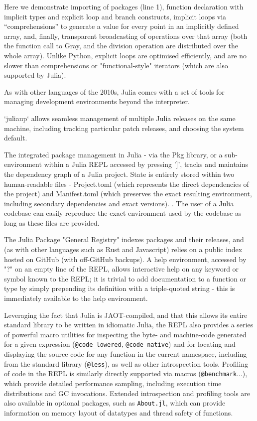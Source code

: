 \documentclass{webofc}
\begin{document}
Here we demonstrate importing of packages (line 1), function declaration with implicit types and explicit loop and branch constructs, implicit loops via ``comprehensions'' to generate a  value for every point in an implicitly defined array, and, finally, transparent broadcasting of operations over that array (both the function call to Gray, and the division operation are distributed over the whole array). 
Unlike Python, explicit loops are optimised efficiently, and are no slower than comprehensions or "functional-style" iterators (which are also supported by Julia).



As with other languages of the 2010s, Julia comes with a set of tools for managing development environments beyond the interpreter.

`juliaup` allows seamless management of multiple Julia releases on the same machine, including tracking particular patch releases, and 
choosing the system default.

The integrated package management in Julia - via the Pkg library, or a sub-environment within a Julia REPL accessed by pressing '$]$', 
tracks and maintains the dependency graph of a Julia project. State is entirely stored within two human-readable files - Project.toml (which represents the 
direct dependencies of the project) and Manifest.toml (which preserves the exact resulting environment, including secondary dependencies and exact versions).
. The user of a Julia codebase can easily reproduce the exact environment used by the codebase as long as these files are provided.

The Julia Package "General Registry" indexes packages and their releases, and (as with other languages such as Rust and Javascript) relies on a public
index hosted on GitHub (with off-GitHub backups).
A help environment, accessed by "?" on an empty line of the REPL, allows interactive help on any keyword or symbol known to the REPL; it is trivial to add documentation to a function or type 
by simply prepending its definition with a triple-quoted string - this is immediately available to the help environment.

Leveraging the fact that Julia is JAOT-compiled, and that this allows its entire standard library to be written in idiomatic Julia, the REPL also provides
a series of powerful macro utilities for inspecting the byte- and machine-code generated for a given expression (\verb$@code_lowered$, \verb$@code_native$) and
for locating and displaying the source code for any function in the current namespace, including from the standard library (\verb$@less$), as well as other introspection
tools. Profiling of code in the REPL is similarly directly supported via macros (\verb$@benchmark$...), which provide detailed performance sampling, including execution time distributions and GC invocations.
Extended introspection and profiling tools are also available in optional packages, such as \texttt{About.jl}, which can provide information 
on memory layout of datatypes and thread safety of functions.
\end{document}
